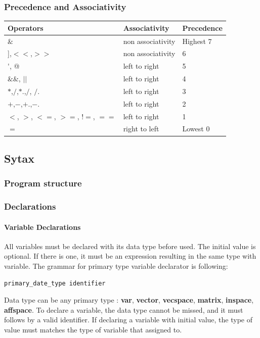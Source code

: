 \documentclass[12pt]{article} %
\begin{document}
\subsubsection{Precedence and Associativity}
\begin{center}
	\begin{tabular}{|l|l|l|}
		\hline
		Operators & Associativity & Precedence\\ \hline
        $\&$  & non associativity & Highest 7  \\ \hline
		[[,]],$<<$,$>>$ & non associativity &    6\\ \hline
		\'{}, @ & left to right &  5\\ \hline
         $\&\&$, $||$ & left to right & 4\\ \hline
		$*$,$/$,$*$.,$/$, $/$. & left to right & 3 \\ \hline
		$+$,$-$,$+$.,$-$.  & left to right & 2\\ \hline
		$<$, $>$, $<=$, $>=$, $!=$, $==$ & left to right & 1\\ \hline
		$=$ & right to left & Lowest 0\\
		\hline
	\end{tabular}
\end{center}


\subsection{Sytax}
\subsubsection{Program structure}
\subsubsection{Declarations}

\paragraph{Variable Declarations}
All variables must be declared with its data type before used. The initial value is optional. If there is one, it must be an expression resulting in the same type with variable. The grammar for primary type variable declarator is following:
\begin{lstlisting}
primary_date_type identifier
\end{lstlisting}

Data type can be any primary type : \textbf{var}, \textbf{vector}, \textbf{vecspace}, \textbf{matrix}, \textbf{inspace}, \textbf{affspace}. To declare a variable, the data type cannot be missed, and it must follows by a valid identifier. If declaring a variable with initial value, the type of value must matches the type of variable that assigned to. \\
\end{document}
